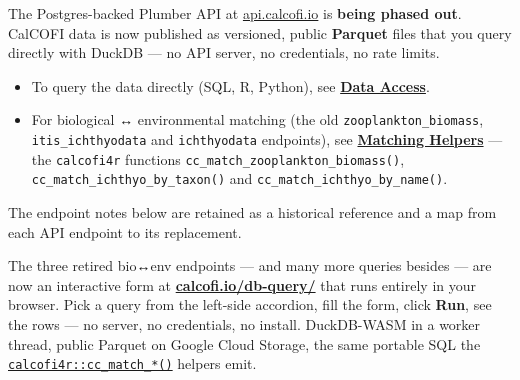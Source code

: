 \documentclass[
  letterpaper,
  DIV=11,
  numbers=noendperiod]{scrreprt}
\providecommand{\tightlist}{%
  \setlength{\itemsep}{0pt}\setlength{\parskip}{0pt}}
\begin{document}
\begin{tcolorbox}[enhanced jigsaw, arc=.35mm, colback=white, left=2mm, leftrule=.75mm, titlerule=0mm, bottomrule=.15mm, colbacktitle=quarto-callout-important-color!10!white, colframe=quarto-callout-important-color-frame, rightrule=.15mm, title=\textcolor{quarto-callout-important-color}{\faExclamation}\hspace{0.5em}{Superseded by direct querying + \texttt{calcofi4r} helpers}, breakable, opacityback=0, toptitle=1mm, toprule=.15mm, coltitle=black, bottomtitle=1mm, opacitybacktitle=0.6]

The Postgres-backed Plumber API at
\href{https://api.calcofi.io}{api.calcofi.io} is \textbf{being phased
out}. CalCOFI data is now published as versioned, public
\textbf{Parquet} files that you query directly with DuckDB --- no API
server, no credentials, no rate limits.

\begin{itemize}
\tightlist
\item
  To query the data directly (SQL, R, Python), see
  \textbf{\hyperref[data-access]{Data Access}}.
\item
  For biological ↔ environmental matching (the old
  \texttt{zooplankton\_biomass}, \texttt{itis\_ichthyodata} and
  \texttt{ichthyodata} endpoints), see
  \textbf{\hyperref[matching-helpers]{Matching Helpers}} --- the
  \texttt{calcofi4r} functions
  \texttt{cc\_match\_zooplankton\_biomass()},
  \texttt{cc\_match\_ichthyo\_by\_taxon()} and
  \texttt{cc\_match\_ichthyo\_by\_name()}.
\end{itemize}

The endpoint notes below are retained as a historical reference and a
map from each API endpoint to its replacement.

\end{tcolorbox}

\begin{tcolorbox}[enhanced jigsaw, arc=.35mm, colback=white, left=2mm, leftrule=.75mm, titlerule=0mm, bottomrule=.15mm, colbacktitle=quarto-callout-tip-color!10!white, colframe=quarto-callout-tip-color-frame, rightrule=.15mm, title=\textcolor{quarto-callout-tip-color}{\faLightbulb}\hspace{0.5em}{Try the new client-side query playground}, breakable, opacityback=0, toptitle=1mm, toprule=.15mm, coltitle=black, bottomtitle=1mm, opacitybacktitle=0.6]

The three retired bio↔env endpoints --- and many more queries besides
--- are now an interactive form at
\textbf{\href{https://calcofi.io/db-query/}{calcofi.io/db-query/}} that
runs entirely in your browser. Pick a query from the left-side
accordion, fill the form, click \textbf{Run}, see the rows --- no
server, no credentials, no install. DuckDB-WASM in a worker thread,
public Parquet on Google Cloud Storage, the same portable SQL the
\hyperref[matching-helpers]{\texttt{calcofi4r::cc\_match\_*()}} helpers
emit.

\end{tcolorbox}
\end{document}
